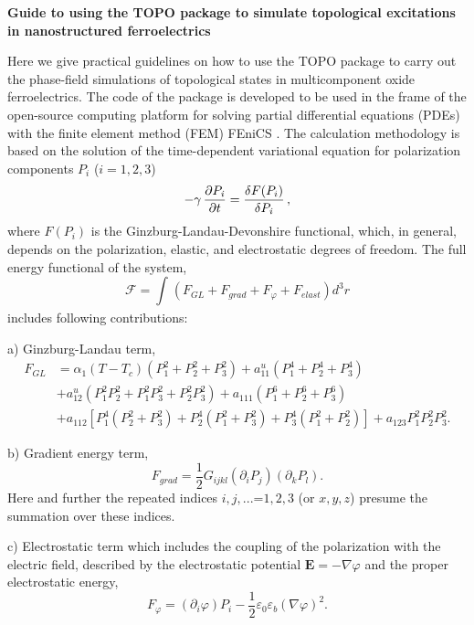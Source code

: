 \documentclass[%
preprint,
amsmath,amssymb,
aps
]{revtex4-2}
\begin{document}
\textbf{Guide to using the TOPO package to simulate topological excitations in nanostructured ferroelectrics} 
 
Here we give practical guidelines on how to use the TOPO package to carry out the phase-field simulations of topological states in multicomponent oxide ferroelectrics. The code of the package is developed to be used in the frame of the open-source computing platform for solving partial differential equations (PDEs) with the finite element method (FEM) FEniCS \cite{LoggMardalEtAl2012a}. The calculation methodology is based on the solution of the time-dependent variational equation for polarization components $P_{\mathit{i}}$ ($i=1,2,3$) 
\begin{equation}
-\gamma \,\frac {\partial P_{\mathit{i}}} {\partial t}=\frac{\delta F(P_i)}{\delta P_{%
\mathit{i}}}\, ,
\end{equation}
where $F(P_i)$ is the Ginzburg-Landau-Devonshire functional, which, in general, depends on the polarization, elastic, and electrostatic degrees of freedom. 
The full energy functional of the system, 
\begin{equation}
\mathcal{F} = 
\int_{}^{} ( F_{GL} + F_{grad} + F_{\varphi}+ F_{elast} )d^{3}r
\label{Functional}
\end{equation} 
includes following contributions: 

a) Ginzburg-Landau term, 
\begin{equation}
\begin{split}
F_{GL} &= \alpha_{1}(T-T_c)(P_{1}^{2}+P_{2}^{2}+P_{3}^{2})+a_{11}^{u}(P_{1}^{4}+P_{2}^{4}+P_{3}^{4}) \\
&+a_{12}^{u}(P_{1}^{2}P_{2}^{2} + P_{1}^{2}P_{3}^{2}+P_{2}^{2}P_{3}^{2})+a_{111}(P_{1}^{6}+P_{2}^{6}+P_{3}^{6}) \\
&+a_{112}[P_{1}^{4}(P_{2}^{2}+P_{3}^{2})+P_{2}^{4}(P_{1}^{2}+P_{3}^{2})+P_{3}^{4}(P_{1}^{2}+P_{2}^{2})]+a_{123}P_{1}^{2}P_{2}^{2}P_{3}^{2}.
\label{GL}
\end{split}
\end{equation}


b) Gradient energy term,
\begin{equation}
 F_{grad} = \frac{1}{2}G_{ijkl}(\partial_{i}P_{j})( \partial_{k}P_{l}).
\label{Grad}
\end{equation} 
Here and further the repeated indices $i,j,...$=$1,2,3$ (or $x,y,z$) presume the summation over these indices.

c) Electrostatic term which includes the coupling of the polarization with the electric field, described by the electrostatic potential $\mathbf{E}=-\nabla \varphi$ and the proper electrostatic energy, 
\begin{equation}
 F_{\varphi} = \left( \partial_{i}\varphi \right)P_{i} - \frac{1}{2}\varepsilon_{0}\varepsilon_{b}{(\nabla\varphi)}^{2}.
\label{Phi}
\end{equation} 
\end{document}
